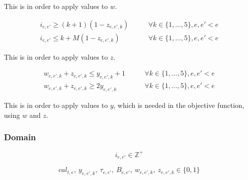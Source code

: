 \documentclass[11pt, a4paper, leqno]{article}
\begin{document}
	This is in order to apply values to $w$.
	
	\begin{align*}
		i_{e,e'} \geq \left(k+1\right)\left(1-z_{e,e',k}\right) &\qquad\forall k \in \{1,\dots,5\},e,e'<e\\
		i_{e,e'} \leq k + M  (1-z_{e,e',k}) &\qquad\forall k \in \{1,\dots,5\},e,e'<e
	\end{align*}
	
	This is in order to apply values to $z$.
	
	\begin{align*}
		w_{e,e',k} + z_{e,e',k} \leq y_{e,e',k} + 1 &\qquad\forall k \in \{1,\dots,5\},e,e'<e\\
		w_{e,e',k} + z_{e,e',k} \geq 2y_{e,e',k} &\qquad\forall k \in \{1,\dots,5\},e,e'<e
	\end{align*}
	
	This is in order to apply values to $y$, which is needed in the objective function, using $w$ and $z$.
	
	\subsubsection{Domain}
	
	\[
		i_{e,e'} \in \mathbb{Z}^{+}
	\]
	
	\[
		cal_{t,e},\ y_{e,e',k},\ \tau_{e,e'},\ B_{e,e'},\ w_{e,e',k},\ z_{e,e',k} \in \{0,1\}
	\]
\end{document}
